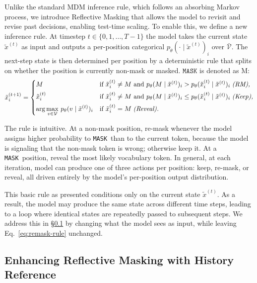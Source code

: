 \documentclass{llmxive}
\providecommand{\methodfull}{Reflective Masking\xspace}
\providecommand{\method}{RM\xspace}
\providecommand{\temporalmethodfull}{History Reference\xspace}
\providecommand{\mask}{\texttt{MASK}}
\begin{document}
Unlike the standard MDM inference rule, which follows an absorbing Markov process, we introduce \methodfull that allows the model to revisit and revise past decisions, enabling test-time scaling. To enable this, we define a new inference rule. At timestep $t \in \{0, 1, \ldots, T-1\}$ the model takes the current state $\tilde{x}^{(t)}$ as input and outputs a per-position categorical $p_\theta(\cdot \mid \tilde{x}^{(t)})_i$ over $\bar{\mathcal{V}}$. The next-step state is then determined per position by a deterministic rule that splits on whether the position is currently non-mask or masked. $\mask$ is denoted as M:
\begin{equation}
\tilde{x}^{(t+1)}_i =
\begin{cases}
M
& \text{if } \tilde{x}^{(t)}_i \neq M \text{ and } p_\theta(M \mid \tilde{x}^{(t)})_i > p_\theta(\tilde{x}^{(t)}_i \mid \tilde{x}^{(t)})_i \; \textit{\text{(\method),}} \\[4pt]
\tilde{x}^{(t)}_i
& \text{if } \tilde{x}^{(t)}_i \neq M \text{ and } p_\theta(M \mid \tilde{x}^{(t)})_i \leq p_\theta(\tilde{x}^{(t)}_i \mid \tilde{x}^{(t)})_i \; \textit{\text{(Keep),}} \\[4pt]
\displaystyle \arg\max_{v \in \mathcal{V}}\, p_\theta(v \mid \tilde{x}^{(t)})_i
& \text{if } \tilde{x}^{(t)}_i = M \; \textit{\text{(Reveal).}}
\end{cases}
\label{eq:remask-rule}
\end{equation}

The rule is intuitive. At a non-mask position, re-mask whenever the model assigns higher probability to \mask\ than to the current token, because the model is signaling that the non-mask token is wrong; otherwise keep it. At a \mask\ position, reveal the most likely vocabulary token. In general, at each iteration, model can produce one of three actions per position: keep, re-mask, or reveal, all driven entirely by the model’s per-position output distribution.


This basic rule as presented conditions only on the current state $\tilde{x}^{(t)}$. As a result, the model may produce the same state across different time steps, leading to a loop where identical states are repeatedly passed to subsequent steps. We address this in \S\ref{sec:temporal-residual} by changing what the model sees as input, while leaving Eq.~\eqref{eq:remask-rule} unchanged.
\subsection{Enhancing \methodfull with \temporalmethodfull }
\label{sec:temporal-residual}
\end{document}
